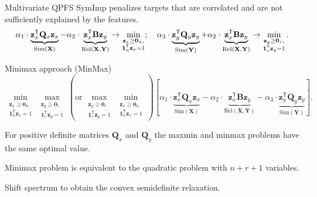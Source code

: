 \documentclass[9pt]{beamer}
\newcommand{\bz}{\mathbf{z}}
\newcommand{\bY}{\mathbf{Y}}
\newcommand{\bX}{\mathbf{X}}
\newcommand{\bB}{\mathbf{B}}
\newcommand{\bQ}{\mathbf{Q}}
\newcommand{\bOne}{\boldsymbol{1}}
\newcommand{\bZero}{\boldsymbol{0}}
\newcommand{\T}{\mathsf{T}}
\begin{document}
\begin{frame}{Multivariate QPFS}
SymImp penalizes targets that are correlated and are not sufficiently explained by the features. 
\[
\alpha_1 \cdot \underbrace{\bz_x^{\T} \bQ_x \bz_x}_{\text{Sim}(\bX)} - \alpha_2 \cdot \underbrace{\vphantom{()} \bz_x^{\T}\mathbf{B} \bz_y}_{\text{Rel}(\bX, \bY)} \rightarrow \min_{\substack{\bz_x \geq \bZero_n, \\ \bOne_n^{\T}\bz_x=1}}; \quad
\alpha_3 \cdot \underbrace{\bz_y^{\T} \bQ_y \bz_y}_{\text{Sim}(\bY)} + \alpha_2 \cdot \underbrace{\vphantom{()} \bz_x^{\T} \mathbf{B} \bz_y}_{\text{Rel}(\bX, \bY)} \rightarrow \min_{\substack{\bz_y \geq \bZero_r,  \\ \bOne_r^{\T}\bz_y=1}}.
\]
\vspace{-0.2cm}
\begin{block}{Minimax approach (MinMax)}
\vspace{-0.5cm}
\[
\min_{\substack{\bz_x \geq \bZero_n \\ \bOne_n^{\T}\bz_x=1}} 	\max_{\substack{\bz_y \geq \bZero_r \\ \bOne_r^{\T}\bz_y=1}} \left(\text {or} \, \max_{\substack{\bz_y \geq \bZero_r \\ \bOne_r^{\T}\bz_y=1}} \min_{\substack{\bz_x \geq \bZero_n \\ \bOne_n^{\T}\bz_x=1}}\right) \left[\alpha_1 \cdot \underbrace{\bz_x^{\T} \bQ_x \bz_x}_{\text{Sim}(\bX)} - \alpha_2 \cdot \underbrace{\bz_x^{\T} \bB \bz_y}_{\text{Rel}(\bX, \bY)} - \alpha_3 \cdot \underbrace{\bz_y^{\T} \bQ_y \bz_y}_{\text{Sim}(\bY)}\right].
\]
\end{block}
\vspace{-0.4cm}
\begin{theorem}[Isachenko, 2018]
	For positive definite matrices $\bQ_x$ and $\bQ_y$ the maxmin and minmax problems have the same optimal value. 
\end{theorem}
\vspace{-0.2cm}
\begin{theorem}[Isachenko, 2018]
	Minimax problem is equivalent to the quadratic problem with $n + r + 1$ variables.
\end{theorem}
Shift spectrum to obtain the convex semidefinite relaxation.

\end{frame}
\end{document}

